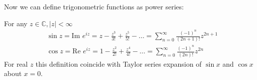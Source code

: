 Now we can define trigonometric functions as power series:

\begin{definition}\label{definition:12.5} For any $z \in \mathbb{C}, |z| < \infty$
    \begin{align*} 
        & \sin z = \text{Im } e^{iz} = z - \frac{z^3}{3!} + \frac{z^5}{5!} - \dots = \sum_{n=0}^{\infty} \frac{(-1)^n}{(2n+1)!}z^{2n+1} \\
        & \cos z = \text{Re } e^{iz} = 1 - \frac{z^2}{2!} + \frac{z^4}{4!} - \dots = \sum_{n=0}^{\infty} \frac{(-1)^n}{(2n)!}z^{2n} 
    \end{align*}
For real $z$ this definition coincide with Taylor series expansion of $\sin x$ and $\cos x$ about $x = 0$.

\end{definition}
